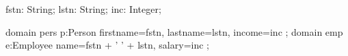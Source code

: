 fstn: String;  lstn: String; inc: Integer;

domain pers p:Person {
    firstname=fstn, lastname=lstn, income=inc
};
domain emp e:Employee {
    name=fstn + ' ' + lstn, salary=inc
};